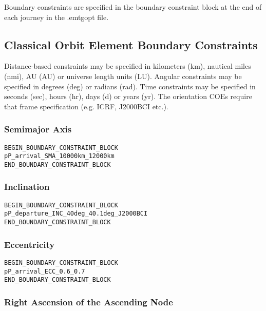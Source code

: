 \documentclass[11pt]{article}
\begin{document}
Boundary constraints are specified in the boundary constraint block at the end of each journey in the .emtgopt file.

\subsection{Classical Orbit Element Boundary Constraints}
\label{sec:boundaryCOEconstraints}

Distance-based constraints may be specified in kilometers (km), nautical miles (nmi), \ac{AU} (AU) or universe length units (LU). Angular constraints may be specified in degrees (deg) or radians (rad). Time constraints may be specified in seconds (sec), hours (hr), days (d) or years (yr). The orientation COEs require that frame specification (e.g. ICRF, J2000BCI etc.).

\subsubsection{Semimajor Axis}
\label{sec:boundarySMAconstraint}

\begin{verbatim}
BEGIN_BOUNDARY_CONSTRAINT_BLOCK
pP_arrival_SMA_10000km_12000km
END_BOUNDARY_CONSTRAINT_BLOCK
\end{verbatim}

\subsubsection{Inclination}
\label{sec:boundaryINCconstraint}
\begin{verbatim}
BEGIN_BOUNDARY_CONSTRAINT_BLOCK
pP_departure_INC_40deg_40.1deg_J2000BCI
END_BOUNDARY_CONSTRAINT_BLOCK
\end{verbatim}

\subsubsection{Eccentricity}
\label{sec:boundaryECCconstraint}

\begin{verbatim}
BEGIN_BOUNDARY_CONSTRAINT_BLOCK
pP_arrival_ECC_0.6_0.7
END_BOUNDARY_CONSTRAINT_BLOCK
\end{verbatim}

\subsubsection{Right Ascension of the Ascending Node}
\label{sec:boundaryRAANconstraint}
\end{document}
